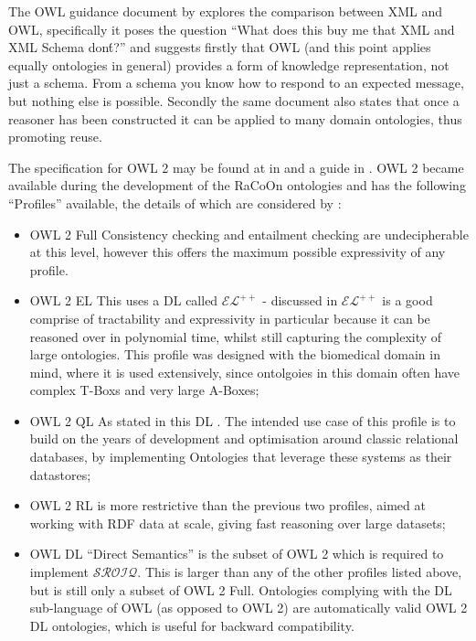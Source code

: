 The OWL guidance document by \citet{McGuinness04} explores the comparison between XML and OWL, specifically it poses the question ``What does this buy me that XML and XML Schema don\'t?'' and suggests firstly that OWL (and this point applies equally ontologies in general) provides a form of knowledge representation, not just a schema. From a schema you know how to respond to an expected message, but nothing else is possible. Secondly the same document also states that once a reasoner has been constructed it can be applied to many domain ontologies, thus promoting reuse.

The specification for OWL 2 may be found at in \cite{Parsia:09:OWO} and a guide in \citet{Parsia12}. OWL 2 became available during the development of the RaCoOn ontologies and has the following ``Profiles'' available, the details of which are considered by \citet{Parsia12}:

\begin{itemize}
    \item OWL 2 Full Consistency checking and entailment checking are undecipherable at this level, however this offers the maximum possible expressivity of any profile. 
    \item OWL 2 EL This uses a DL called \(\mathcal{EL}^{++}\) - discussed in \citet{Baader2005} \(\mathcal{EL}^{++}\) is a good comprise of tractability and expressivity in particular because it can be reasoned over in polynomial time, whilst still capturing the complexity of large ontologies. This profile was designed with the biomedical domain in mind, where it is used extensively, since ontolgoies in this domain often have complex T-Boxs and very large A-Boxes;
    \item OWL 2 QL As stated in \citep{Parsia12} this DL . The intended use case of this profile is to build on the years of development and optimisation around classic relational databases, by implementing Ontologies that leverage these systems as their datastores;
    \item OWL 2 RL is more restrictive than the previous two profiles, aimed at working with RDF data at scale, giving fast reasoning over large datasets;
    \item OWL DL ``Direct Semantics'' is the subset of OWL 2 which is required to implement \(\mathcal{SROIQ}\). This is larger than any of the other profiles listed above, but is still only a subset of OWL 2 Full. Ontologies complying with the DL sub-language of OWL (as opposed to OWL 2) are automatically valid OWL 2 DL ontologies, which is useful for backward compatibility. 
\end{itemize}

